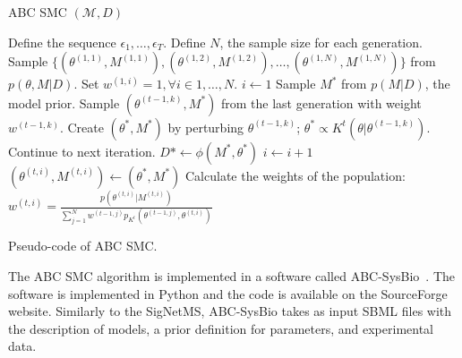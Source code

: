 \begin{algorithm}[h]
\textsc{ABC SMC} $(\mathcal{M}, D)$
\begin{algorithmic}[1]
    \State Define the sequence $\epsilon_1, \ldots, \epsilon_T$.
    \State Define $N$, the sample size for each generation. 
    \State Sample $\{(\theta^{(1, 1)}, M^{(1, 1)}), 
                     (\theta^{(1, 2)}, M^{(1, 2)}), \ldots, 
                     (\theta^{(1, N)}, M^{(1, N)})\}$ from 
                     $p (\theta, M| D)$.
    \State Set $w^{(1, i)} = 1, \forall i \in {1, \ldots, N}$.  
        \State $i \gets 1$
            \State Sample $M^*$ from $p (M | D)$, the model prior.
            \State Sample $(\theta^{(t - 1, k)}, M^*)$ from the 
                last generation with weight $w^{(t - 1, k)}$.
            \State Create $(\theta^*, M^*)$ by perturbing 
                $\theta^{(t - 1, k)}$; 
                $\theta^* \propto K^t(\theta | \theta^{(t - 1, k)})$.
                \State Continue to next iteration.
            \EndIf
            \State $D* \gets \phi (M^*, \theta^*)$
                \State $i \gets i + 1$
                \State $(\theta^{(t, i)}, M^{(t, i)}) \gets 
                    (\theta^*, M^*)$
            \EndIf
        \EndWhile
        \State Calculate the weights of the population:
$                w^{(t, i)} = \frac{p (\theta^{(t, i)} | M^{(t, i)})}
                         {\sum_{j = 1}^N w^{(t-1, j)}p_{K^t}
                            (\theta^{(t-1, j)}, \theta^{(t, i)})}$
    \EndFor
    \Return
\end{algorithmic}
\caption{Pseudo-code of ABC SMC.}
\label{code:abc_smc}
\end{algorithm}
The ABC SMC algorithm is implemented in a software called 
ABC-SysBio~\cite{Liepe2014}. The software is implemented in Python and
the code is available on the SourceForge website. Similarly to the 
SigNetMS, ABC-SysBio takes as input SBML files with the description of
models, a prior definition for parameters, and experimental data.

